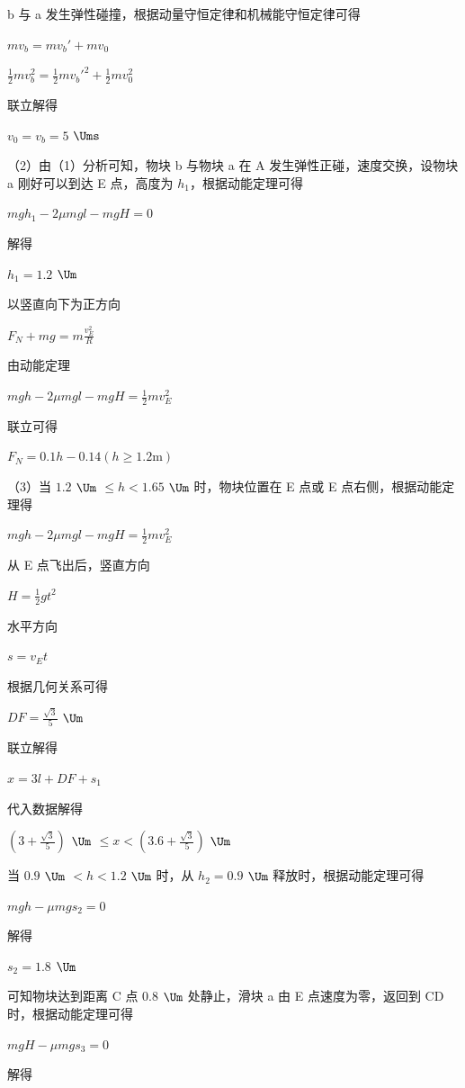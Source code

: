 \documentclass[\gkver]{gaokaozhenti}
\begin{document}
\begin{enumerate}
{	b 与 a 发生弹性碰撞，根据动量守恒定律和机械能守恒定律可得

	$mv_{b}=mv_{b}'+mv_{0}$

	$\frac{1}{2}mv_{b}^{2}=\frac{1}{2}mv_{b}'^{2}+\frac{1}{2}mv_{0}^{2}$

	联立解得

	$v_{0}=v_{b}=5$ $\Ums$

	（2）由（1）分析可知，物块 b 与物块 a 在 A 发生弹性正碰，速度交换，设物块 a 刚好可以到达 E 点，高度为 $h_{1}$，根据动能定理可得

	$mgh_{1}-2\mu mgl-mgH=0$

	解得

	$h_{1}=1.2$ $\Um$

	以竖直向下为正方向

	$F_{N} + mg = m \frac{v_{E}^{2}}{R}$

	由动能定理

	$mgh - 2\mu mgl - mgH = \frac{1}{2}mv_{E}^{2}$

	联立可得

	$F_{N}=0.1h-0.14(h\geqslant1.2\mathrm{m})$

	（3）当 $1.2$ $\Um$ $\leqslant h < 1.65$ $\Um$ 时，物块位置在 E 点或 E 点右侧，根据动能定理得

	$mgh - 2\mu mgl - mgH = \frac{1}{2}mv_{E}^{2}$

	从 E 点飞出后，竖直方向

	$H = \frac{1}{2}gt^{2}$

	水平方向

	$s = v_{E}t$

	根据几何关系可得

	$DF = \frac{\sqrt{3}}{5}$ $\Um$

	联立解得

	$x = 3l + DF + s_{1}$

	代入数据解得

	$\left(3 + \frac{\sqrt{3}}{5}\right)$ $\Um$ $\leqslant x < \left(3.6 + \frac{\sqrt{3}}{5}\right)$ $\Um$

	当 $0.9$ $\Um$ $< h < 1.2$ $\Um$ 时，从 $h_{2} = 0.9$ $\Um$ 释放时，根据动能定理可得

	$mgh - \mu mgs_{2} = 0$

	解得

	$s_{2} = 1.8$ $\Um$

	可知物块达到距离 C 点 $0.8$ $\Um$ 处静止，滑块 a 由 E 点速度为零，返回到 CD 时，根据动能定理可得

	$mgH - \mu mgs_{3} = 0$

	解得

}
\end{enumerate}
\end{document}
